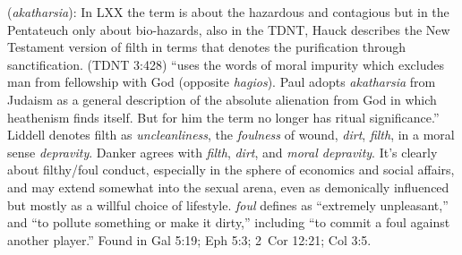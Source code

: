 \item[Foul,]

(\textit{akatharsia}):
In LXX the term is about the hazardous and contagious but in the Pentateuch only about bio-hazards, also in the TDNT, Hauck describes the New Testament version of filth in terms that denotes the purification through sanctification. (TDNT 3:428) ``uses the words of moral impurity which excludes man from fellowship with God (opposite \emph{hagios}). Paul adopts \emph{akatharsia} from Judaism as a general description of the absolute alienation from God in which heathenism finds itself. But for him the term no longer has ritual significance.'' Liddell denotes filth as \emph{uncleanliness}, the \emph{foulness} of wound, \emph{dirt}, \emph{filth}, in a moral sense \emph{depravity}. Danker agrees with \emph{filth}, \emph{dirt}, and \emph{moral depravity}. It's clearly about filthy/foul conduct, especially in the sphere of economics and social affairs, and may extend somewhat into the sexual arena, even as demonically influenced but mostly as a willful choice of lifestyle. \emph{foul} defines as ``extremely unpleasant,'' and ``to pollute something or make it dirty,'' including ``to commit a foul against another player.''
Found in Gal 5:19; Eph 5:3; 2~Cor 12:21; Col 3:5.
